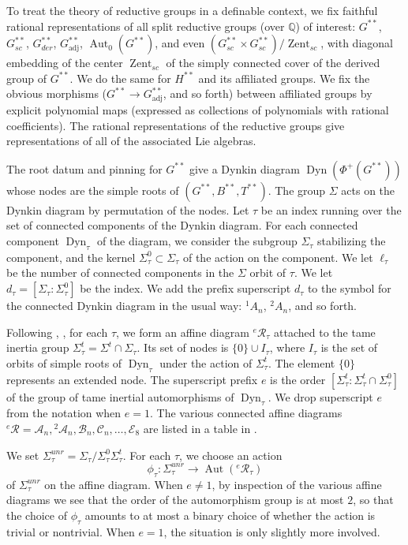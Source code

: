 \documentclass[12pt]{amsart}
\newcommand{\op}[1]{\operatorname{#1}}
\newcommand{\ring}[1]{{\mathbb #1}}
\newcommand{\cal}[1]{\mathcal{#1}}
\def\R{\cal{R}}
\theoremstyle{plain}
\theoremstyle{definition}
\begin{document}
To treat the theory of reductive groups in a definable context, we fix
faithful rational representations of all split reductive groups (over
$\ring{Q}$) of interest: $G^{**}$, $G^{**}_{sc}$, $G^{**}_{der}$,
$G^{**}_{\op{adj}}$, $\op{Aut}_0(G^{**})$, and even $(G^{**}_{sc}\times
G^{**}_{sc})/\op{Zent}_{sc}$, with diagonal embedding of the center
$\op{Zent}_{sc}$ of the simply connected cover of the derived group of
$G^{**}$.  We do the same for $H^{**}$ and its affiliated groups.  We
fix the obvious morphisms ($G^{**}\to G^{**}_{\op{adj}}$, and so forth)
between affiliated groups by explicit polynomial maps (expressed as
collections of polynomials with rational coefficients).  The rational
representations of the reductive groups give
representations of all of the associated Lie algebras.

The root datum and pinning for $G^{**}$ give a Dynkin diagram
$\op{Dyn}(\Phi^+(G^{**}))$ whose nodes are the simple roots of
$(G^{**},B^{**},T^{**})$.  The group $\Sigma$ acts on the Dynkin
diagram by permutation of the nodes.  Let $\tau$ be an index running
over the set of connected components of the Dynkin diagram.  For each
connected component $\op{Dyn}_\tau$ of the diagram, we consider the
subgroup $\Sigma_\tau$ stabilizing the component, and the kernel
$\Sigma^0_\tau\subset \Sigma_\tau$ of the action on the component.  We
let $\ell_\tau$ be the number of connected components in the $\Sigma$
orbit of $\tau$.  We let $d_\tau = [\Sigma_\tau:\Sigma_\tau^0]$ be the
index.  We add the prefix superscript $d_\tau$ to the symbol for the
connected Dynkin diagram in the usual way: ${}^1A_n$, ${}^2A_n$, and
so forth.

Following \cite{reeder2010torsion}, \cite{Gross}, for each $\tau$, we
form an affine diagram ${}^e\R_\tau$ attached to the tame inertia
group $\Sigma^t_\tau = \Sigma^t\cap \Sigma_\tau$.  Its set of nodes is
$\{0\}\cup I_\tau$, where $I_\tau$ is the set of orbits of simple
roots of $\op{Dyn}_\tau$ under the action of $\Sigma^t_\tau$.  The
element $\{0\}$ represents an extended node.  The superscript prefix
$e$ is the order $[\Sigma^t_\tau:\Sigma^t_\tau\cap \Sigma_\tau^0]$ of
the group of tame inertial automorphisms of $\op{Dyn}_\tau$.  We drop
superscript $e$ from the notation when $e=1$.  The various connected
affine diagrams ${}^e\R = \cal{A}_n, {}^2\cal{A}_n, \cal{B}_n,
\cal{C}_n,\ldots, \cal{E}_8$ are listed in a table in \cite{Gross}.

We set $\Sigma^{unr}_\tau = \Sigma_\tau/\Sigma_\tau^0\Sigma^t_\tau$.
For each $\tau$, we choose an action
\[
\phi_\tau:\Sigma^{unr}_\tau\to \op{Aut}({}^e\R_\tau)
\]
of $\Sigma^{unr}_\tau$ on the affine diagram.  When $e\ne 1$, by
inspection of the various affine diagrams we see that the order of the
automorphism group is at most $2$, so that the choice of $\phi_\tau$
amounts to at most a binary choice of whether the action is trivial or
nontrivial.  When $e=1$, the situation is only slightly more
involved.
\end{document}
